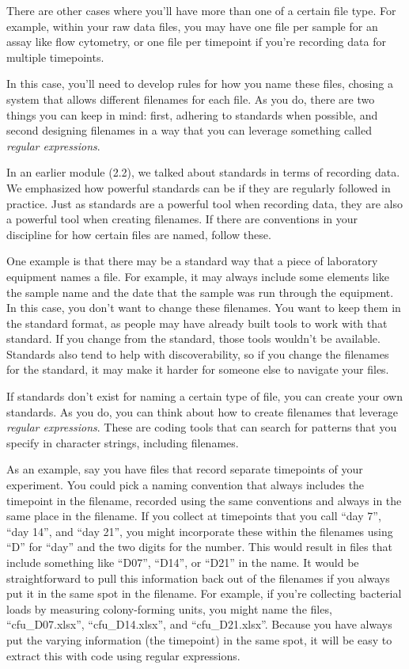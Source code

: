 \documentclass[]{tufte-book}
\begin{document}
There are other cases where you'll have more than one of a certain file type.
For example, within your raw data files, you may have one file per sample for
an assay like flow cytometry, or one file per timepoint if you're recording
data for multiple timepoints.

In this case, you'll need to develop rules for how you name these files,
chosing a system that allows different filenames for each file. As you do,
there are two things you can keep in mind: first, adhering to standards when
possible, and second designing filenames in a way that you can leverage
something called \emph{regular expressions}.

In an earlier module (2.2), we talked about standards in terms of recording
data. We emphasized how powerful standards can be if they are regularly
followed in practice. Just as standards are a powerful tool when recording
data, they are also a powerful tool when creating filenames.
If there are conventions in your discipline for how certain files are named,
follow these.

One example is that there may be a standard way that a piece of laboratory
equipment names a file. For example, it may always include some elements like
the sample name and the date that the sample was run through the equipment.
In this case, you don't want to change these filenames. You want to keep them
in the standard format, as people may have already built tools to work with
that standard. If you change from the standard, those tools wouldn't be available.
Standards also tend to help with discoverability, so if you change the filenames
for the standard, it may make it harder for someone else to navigate your files.

If standards don't exist for naming a certain type of file, you can create your
own standards. As you do, you can think about how to create filenames that
leverage \emph{regular expressions}. These are coding tools that can search for
patterns that you specify in character strings, including filenames.

As an example, say you have files that record separate timepoints of your
experiment. You could pick a naming convention that always includes the
timepoint in the filename, recorded using the same conventions and always in
the same place in the filename. If you collect at timepoints that you call
``day 7'', ``day 14'', and ``day 21'', you might incorporate these within the filenames
using ``D'' for ``day'' and the two digits for the number. This would result in
files that include something like ``D07'', ``D14'', or ``D21'' in the name. It would
be straightforward to pull this information back out of the filenames if you
always put it in the same spot in the filename. For example, if you're collecting
bacterial loads by measuring colony-forming units, you might name the files,
``cfu\_D07.xlsx'', ``cfu\_D14.xlsx'', and ``cfu\_D21.xlsx''. Because you have
always put the varying information (the timepoint) in the same spot, it
will be easy to extract this with code using regular expressions.
\end{document}
